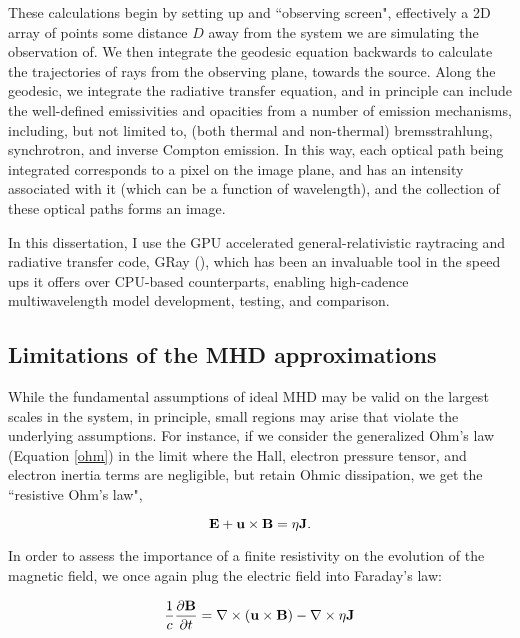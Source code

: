 These calculations begin by setting up and ``observing screen", effectively a 2D array of points some distance $D$ away from the system we are simulating the observation of.  We then integrate the geodesic equation backwards to calculate the trajectories of rays from the observing plane, towards the source.  Along the geodesic, we integrate the radiative transfer equation, and in principle can include the well-defined emissivities and opacities from a number of emission mechanisms, including, but not limited to, (both thermal and non-thermal) bremsstrahlung, synchrotron, and inverse Compton emission.  In this way, each optical path being integrated corresponds to a pixel on the image plane, and has an intensity associated with it (which can be a function of wavelength), and the collection of these optical paths forms an image. 

In this dissertation, I use the GPU accelerated general-relativistic raytracing and radiative transfer code, GRay (\citealt{chan2013}), which has been an invaluable tool in the speed ups it offers over CPU-based counterparts, enabling high-cadence multiwavelength model development, testing, and comparison.

\subsection{Limitations of the MHD approximations}
While the fundamental assumptions of ideal MHD may be valid on the largest scales in the system, in principle, small regions may arise that violate the underlying assumptions.  For instance, if we consider the generalized Ohm's law (Equation \ref{ohm}) in the limit where the Hall, electron pressure tensor, and electron inertia terms are negligible, but retain Ohmic dissipation, we get the ``resistive Ohm's law",

\begin{equation}
\bold{E} + \bold{u} \times \bold{B} = \eta \bold{J}.
\end{equation}

In order to assess the importance of a finite resistivity on the evolution of the magnetic field, we once again plug the electric field into Faraday's law:


\begin{equation}
	\frac{1}{c}\frac{\partial \bold{B}}{\partial t} =\nabla \times (\bold{u}\times\bold{B}) -\nabla \times \eta \bold{J}
	\label{faraday_resistive}
\end{equation}
	
